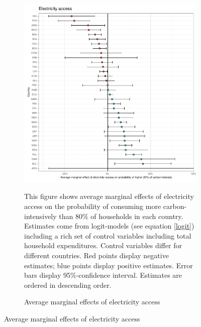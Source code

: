  \begin{figure}[ht!]\ContinuedFloat
   \centering
   \begin{subfigure}[b]{\textwidth}
   \centering
   \caption{Average marginal effects of electricity access} \label{fig:Logit_ME_electricity}
   \includegraphics{1_Figures/Analysis_Logit_Models_Marginal_Effects/Average_Marginal_Effects_affected_upper_80_electricity.access_2017B.pdf}
   \begin{subcaption2}
     This figure shows average marginal effects of electricity access on the probability of consuming more carbon-intensively than 80\% of households in each country. Estimates come from logit-models (see equation \ref{logit}) including a rich set of control variables including total household expenditures. Control variables differ for different countries. Red points display negative estimates; blue points display positive estimates. Error bars display 95\%-confidence interval. Estimates are ordered in descending order.
   \end{subcaption2}
   \end{subfigure}
 \end{figure}
 \clearpage

